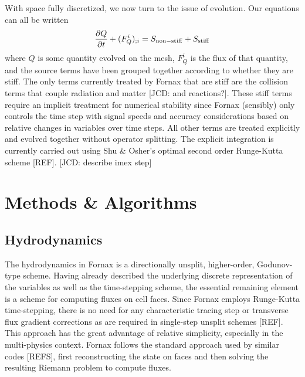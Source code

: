 \documentclass[iop]{emulateapj}
\begin{document}
With space fully discretized, we now turn to the issue of evolution.  Our equations can all be written
\begin{equation}
\frac{\partial Q}{\partial t} + (F^i_Q)_{;i} = S_{\rm non-stiff} + S_{\rm stiff}
\end{equation}
where $Q$ is some quantity evolved on the mesh, $F^i_Q$ is the flux of that quantity, and the source terms have been grouped together according to whether they are stiff.  The only terms currently treated by Fornax that are stiff are the collision terms that couple radiation and matter [JCD: and reactions?].  These stiff terms require an implicit treatment for numerical stability since Fornax (sensibly) only controls the time step with signal speeds and accuracy considerations based on relative changes in variables over time steps.  All other terms are treated explicitly and evolved together without operator splitting.  The explicit integration is currently carried out using Shu \& Osher's optimal second order Runge-Kutta scheme [REF].  [JCD: describe imex step]

\section{Methods \& Algorithms}
\subsection{Hydrodynamics}
The hydrodynamics in Fornax is a directionally unsplit, higher-order, Godunov-type scheme.  Having already described the underlying discrete representation of the variables as well as the time-stepping scheme, the essential remaining element is a scheme for computing fluxes on cell faces.  Since Fornax employs Runge-Kutta time-stepping, there is no need for any characteristic tracing step or transverse flux gradient corrections as are required in single-step unsplit schemes [REF].  This approach has the great advantage of relative simplicity, especially in the multi-physics context.  Fornax follows the standard approach used by similar codes [REFS], first reconstructing the state on faces and then solving the resulting Riemann problem to compute fluxes.
\end{document}
